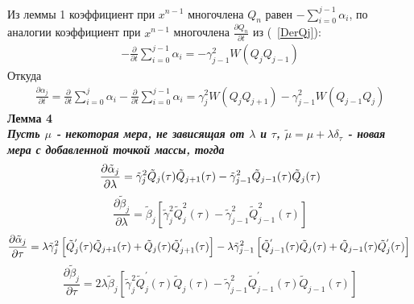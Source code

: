 Из леммы 1 коэффициент при $x^{n-1}$ многочлена $Q_n$
равен $-\sum\limits_{i=0}^{j-1}{\alpha_i}$, по аналогии
коэффициент при $x^{n-1}$ многочлена $\frac{\partial Q_n}{\partial t}$ из
(~\ref{DerQj}):
\begin{eqnarray}
-\frac{\partial}{\partial t} \sum\limits_{i=0}^{j-1}{\alpha_i}=-\gamma_{j-1}^2 W(Q_jQ_{j-1})
\end{eqnarray}
Откуда
\begin{eqnarray}
\frac{\partial \alpha_j} {\partial t}=
\frac{\partial }{\partial t} \sum\limits_{i=0}^{j}{\alpha_i}-
\frac{\partial }{\partial t} \sum\limits_{i=0}^{j-1}{\alpha_i}=
\gamma_j^2W(Q_jQ_{j+1})-\gamma_{j-1}^2W(Q_{j-1}Q_j) \nonumber
\end{eqnarray}
\bf Лемма 4 \rm \\
\it Пусть $\mu$ - некоторая мера, не зависящая от $\lambda$ и $\tau$,
$\tilde{\mu}=\mu+\lambda\delta_{\tau}$ - новая мера с добавленной точкой массы, тогда
 \rm
\begin{equation}
\frac{\partial \tilde{\alpha}_j}{\partial \lambda}=\tilde{\gamma}_j^2\tilde{Q}_j(\tau) \tilde{Q}_{j+1}(\tau)-\tilde{\gamma}_{j-1}^2\tilde{Q}_{j-1}(\tau) \tilde{Q}_j(\tau) \nonumber \\
\end{equation}
\begin{equation}
\frac{\partial \tilde{\beta}_j}
{\partial \lambda}
=
\tilde{\beta}_j
\left[
\tilde{\gamma}_j^2 \tilde{Q}_j^2(\tau)-
\tilde{\gamma}_{j-1}^2 \tilde{Q}_{j-1}^2(\tau)
\right]
\end{equation}
\begin{equation}
\frac{\partial \tilde{\alpha}_j}{\partial \tau}=
\lambda \tilde{\gamma}_j^2
\left[
\tilde{Q}^{'}_j(\tau)\tilde{Q}_{j+1}(\tau)+
\tilde{Q}_j(\tau)\tilde{Q}^{'}_{j+1}(\tau) \right]
-\lambda \tilde{\gamma}_{j-1}^2
\left[ \tilde{Q}^{'}_{j-1}(\tau)\tilde{Q}_{j}(\tau)+\tilde{Q}_{j-1}(\tau)\tilde{Q}^{'}_{j}(\tau) \right] \nonumber \\
\end{equation}
\begin{equation}
\frac{\partial \tilde{\beta}_j}{\partial \tau}=2\lambda \tilde{\beta}_j
\left[
\tilde{\gamma}_j^2\tilde{Q}^{'}_j(\tau)\tilde{Q}_j(\tau)-
\tilde{\gamma}_{j-1}^2\tilde{Q}^{'}_{j-1}(\tau)\tilde{Q}_{j-1}(\tau)
\right]
\end{equation}
